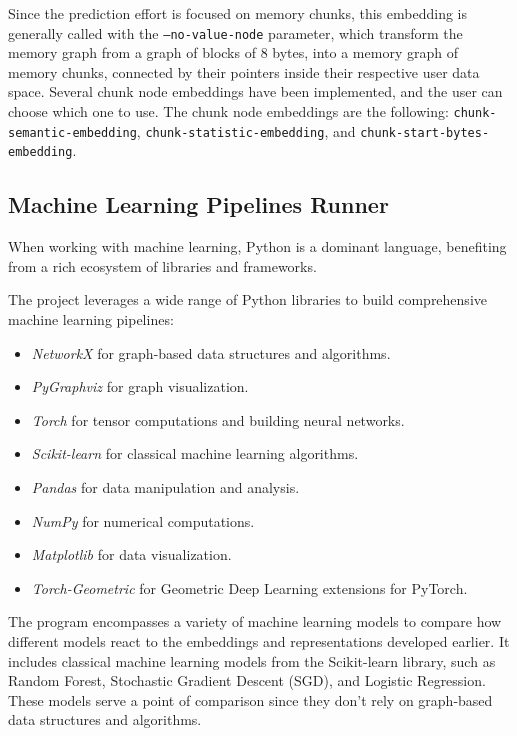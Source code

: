 Since the prediction effort is focused on memory chunks, this embedding is generally called with the \texttt{--no-value-node} parameter, which transform the memory graph from a graph of blocks of 8 bytes, into a memory graph of memory chunks, connected by their pointers inside their respective user data space. Several chunk node embeddings have been implemented, and the user can choose which one to use. The chunk node embeddings are the following: \texttt{chunk-semantic-embedding}, \texttt{chunk-statistic-embedding}, and \texttt{chunk-start-bytes-embedding}.

\subsection{Machine Learning Pipelines Runner}

When working with machine learning, Python is a dominant language, benefiting from a rich ecosystem of libraries and frameworks.

The project leverages a wide range of Python libraries to build comprehensive machine learning pipelines:
\begin{itemize}
    \item \textit{NetworkX} for graph-based data structures and algorithms.
    \item \textit{PyGraphviz} for graph visualization.
    \item \textit{Torch} for tensor computations and building neural networks.
    \item \textit{Scikit-learn} for classical machine learning algorithms.
    \item \textit{Pandas} for data manipulation and analysis.
    \item \textit{NumPy} for numerical computations.
    \item \textit{Matplotlib} for data visualization.
    \item \textit{Torch-Geometric} for Geometric Deep Learning extensions for PyTorch.
\end{itemize}

The program encompasses a variety of machine learning models to compare how different models react to the embeddings and representations developed earlier. It includes classical machine learning models from the Scikit-learn library, such as Random Forest, Stochastic Gradient Descent (SGD), and Logistic Regression. These models serve a point of comparison since they don't rely on graph-based data structures and algorithms. 

